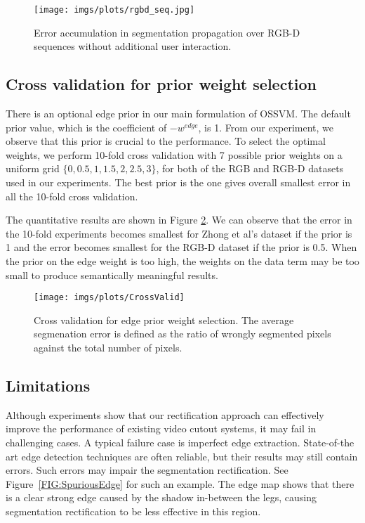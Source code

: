 \documentclass[10pt,journal,compsoc]{newIEEEtran}
\begin{document}
\begin{figure}[!t]
\centering
\texttt{[image: imgs/plots/rgbd\_seq.jpg]}
\caption{Error accumulation in segmentation propagation over RGB-D sequences without additional user interaction. }\label{FIG:Rst_SeqPropagRGBD}\vspace{-0.5cm}
\end{figure}\subsection{Cross validation for prior weight selection}
There is an optional edge prior in our main formulation of OSSVM. The default prior value, which is the coefficient of $-w^{edge}$, is 1. From our experiment, we observe that this prior is crucial to the performance. To select the optimal weights, we perform 10-fold cross validation with 7 possible prior weights on a uniform grid $\{0,0.5,1,1.5,2,2.5,3\}$, for both of the RGB and RGB-D datasets used in our experiments. The best prior is the one gives overall smallest error in all the 10-fold cross validation. 

The quantitative results are shown in Figure \ref{FIG:CrossValid}. We can observe that the error in the 10-fold experiments becomes smallest for Zhong et al's dataset if the prior is 1 and the error becomes smallest for the RGB-D dataset if the prior is 0.5. When the prior on the edge weight is too high, the weights on the data term may be too small to produce semantically meaningful results. 
\begin{figure}[!t]
 	\centering
 	\texttt{[image: imgs/plots/CrossValid]}
 	\caption{Cross validation for edge prior weight selection. The average segmenation error is defined as the ratio of wrongly segmented pixels against the total number of pixels.}\label{FIG:CrossValid}
 \end{figure}\subsection{Limitations}\label{sec:discussion}
Although experiments show that our rectification approach can effectively improve the performance of existing video cutout systems, it may fail in challenging cases. A typical failure case is imperfect edge extraction. State-of-the art edge detection techniques are often reliable, but their results may still contain errors. Such errors may impair the segmentation rectification. See Figure~\ref{FIG:SpuriousEdge} for such an example. The edge map shows that there is a clear strong edge caused by the shadow in-between the legs, causing segmentation rectification to be less effective in this region. %
\end{document}
